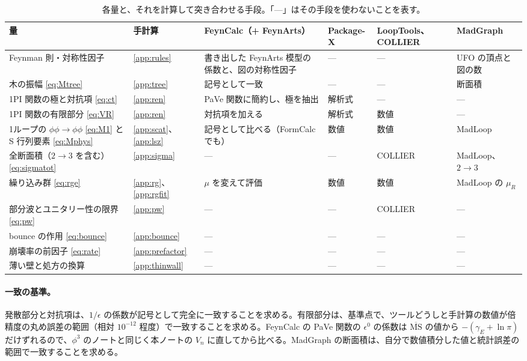 \documentclass[a4paper,10pt]{ltjsarticle}
\begin{document}
\begin{table}[tbp]
\centering\small
\caption{各量と、それを計算して突き合わせる手段。「—」はその手段を使わないことを表す。}
\label{tab:plan}
\begin{tabularx}{\linewidth}{>{\raggedright\arraybackslash}p{3.4cm}>{\raggedright\arraybackslash}p{1.6cm}>{\raggedright\arraybackslash}X>{\raggedright\arraybackslash}p{2.0cm}>{\raggedright\arraybackslash}p{1.7cm}>{\raggedright\arraybackslash}p{2.0cm}}
\toprule
\textbf{量} & \textbf{手計算} & \textbf{FeynCalc（+ FeynArts）} & \textbf{Package-X} & \textbf{LoopTools、COLLIER} & \textbf{MadGraph} \\
\midrule
Feynman 則・対称性因子 & \ref{app:rules} & 書き出した FeynArts 模型の係数と、図の対称性因子 & — & — & UFO の頂点と図の数 \\
木の振幅 \eqref{eq:Mtree} & \ref{app:tree} & 記号として一致 & — & — & 断面積 \\
1PI 関数の極と対抗項 \eqref{eq:ct} & \ref{app:ren} & PaVe 関数に簡約し、極を抽出 & 解析式 & — & — \\
1PI 関数の有限部分 \eqref{eq:VR} & \ref{app:ren} & 対抗項を加える & 解析式 & 数値 & — \\
1ループの $\phi\phi\to\phi\phi$ \eqref{eq:M1} と S 行列要素 \eqref{eq:Mphys} & \ref{app:scat}、\ref{app:lsz} & 記号として比べる（FormCalc でも） & 数値 & 数値 & MadLoop \\
全断面積（$2\to3$ を含む）\eqref{eq:sigmatot} & \ref{app:sigma} & — & — & COLLIER & MadLoop、$2\to3$ \\
繰り込み群 \eqref{eq:rge} & \ref{app:rg}、\ref{app:rgfit} & $\mu$ を変えて評価 & 数値 & 数値 & MadLoop の $\mu_R$ \\
部分波とユニタリー性の限界 \eqref{eq:pw} & \ref{app:pw} & — & — & COLLIER & — \\
bounce の作用 \eqref{eq:bounce} & \ref{app:bounce} & — & — & — & — \\
崩壊率の前因子 \eqref{eq:rate} & \ref{app:prefactor} & — & — & — & — \\
薄い壁と処方の換算 & \ref{app:thinwall} & — & — & — & — \\
\bottomrule
\end{tabularx}
\end{table}

\paragraph{一致の基準。}発散部分と対抗項は、$1/\epsilon$ の係数が記号として完全に一致することを求める。有限部分は、基準点で、ツールどうしと手計算の数値が倍精度の丸め誤差の範囲（相対 $10^{-12}$ 程度）で一致することを求める。FeynCalc の PaVe 関数の $\epsilon^0$ の係数は $\overline{\mathrm{MS}}$ の値から $-(\gamma_E+\ln\pi)$ だけずれるので、$\phi^3$ のノートと同じく本ノートの $V_n$ に直してから比べる。MadGraph の断面積は、自分で数値積分した値と統計誤差の範囲で一致することを求める。
\end{document}
